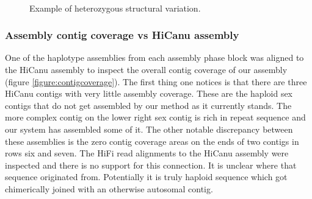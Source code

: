 \begin{figure}[htbp!]
\caption{Example of heterozygous structural variation.}
\label{figure:assemblyplot}
\begin{centering}
 \\
\end{centering}
\end{figure}

\subsubsection{Assembly contig coverage vs HiCanu assembly}

\par{
One of the haplotype assemblies from each assembly phase block was aligned to the HiCanu assembly to inspect the overall contig coverage of our assembly (figure \ref{figure:contigcoverage}). The first thing one notices is that there are three HiCanu contigs with very little assembly coverage. These are the haploid sex contigs that do not get assembled by our method as it currently stands. The more complex contig on the lower right sex contig is rich in repeat sequence and our system has assembled some of it. The other notable discrepancy between these assemblies is the zero contig coverage areas on the ends of two contigs in rows six and seven. The HiFi read alignments to the HiCanu assembly were inspected and there is no support for this connection. It is unclear where that sequence originated from. Potentially it is truly haploid sequence which got chimerically joined with an otherwise autosomal contig.
}

